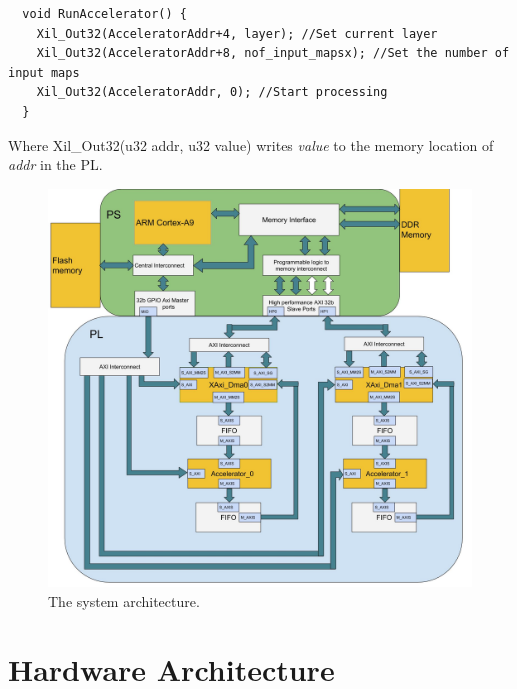 \begin{lstlisting}
  void RunAccelerator() {
  	Xil_Out32(AcceleratorAddr+4, layer); //Set current layer
	Xil_Out32(AcceleratorAddr+8, nof_input_mapsx); //Set the number of input maps
	Xil_Out32(AcceleratorAddr, 0); //Start processing
  }
\end{lstlisting}

Where Xil\_Out32(u32 addr, u32 value) writes \textit{value} to the memory location of \textit{addr} in the PL. 



 


\begin{figure}[h!]
  \centering
      \includegraphics[width=1.0\textwidth]{Figures/Method/system_architecture}
    \caption[The system architecture]{The system architecture.}
    \label{fig_system_architecture}
\end{figure}

\section{Hardware Architecture} \label{sec_hardware_architecture}


